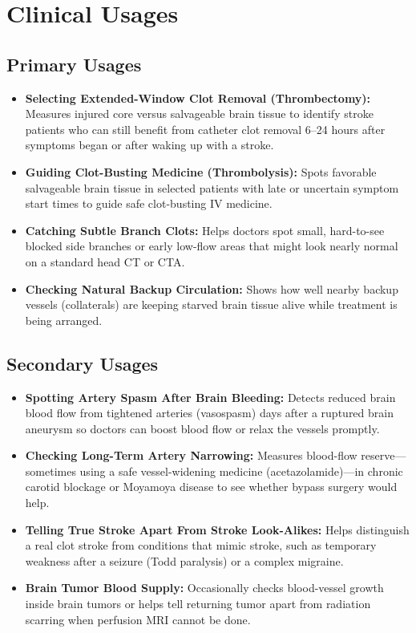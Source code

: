\section{Clinical Usages}

\subsection{Primary Usages}
\begin{itemize}
    \item \textbf{Selecting Extended-Window Clot Removal (Thrombectomy):} Measures injured core versus salvageable brain tissue to identify stroke patients who can still benefit from catheter clot removal 6--24 hours after symptoms began or after waking up with a stroke.
    \item \textbf{Guiding Clot-Busting Medicine (Thrombolysis):} Spots favorable salvageable brain tissue in selected patients with late or uncertain symptom start times to guide safe clot-busting IV medicine.
    \item \textbf{Catching Subtle Branch Clots:} Helps doctors spot small, hard-to-see blocked side branches or early low-flow areas that might look nearly normal on a standard head CT or CTA.
    \item \textbf{Checking Natural Backup Circulation:} Shows how well nearby backup vessels (collaterals) are keeping starved brain tissue alive while treatment is being arranged.
\end{itemize}

\subsection{Secondary Usages}
\begin{itemize}
    \item \textbf{Spotting Artery Spasm After Brain Bleeding:} Detects reduced brain blood flow from tightened arteries (vasospasm) days after a ruptured brain aneurysm so doctors can boost blood flow or relax the vessels promptly.
    \item \textbf{Checking Long-Term Artery Narrowing:} Measures blood-flow reserve---sometimes using a safe vessel-widening medicine (acetazolamide)---in chronic carotid blockage or Moyamoya disease to see whether bypass surgery would help.
    \item \textbf{Telling True Stroke Apart From Stroke Look-Alikes:} Helps distinguish a real clot stroke from conditions that mimic stroke, such as temporary weakness after a seizure (Todd paralysis) or a complex migraine.
    \item \textbf{Brain Tumor Blood Supply:} Occasionally checks blood-vessel growth inside brain tumors or helps tell returning tumor apart from radiation scarring when perfusion MRI cannot be done.
\end{itemize}

